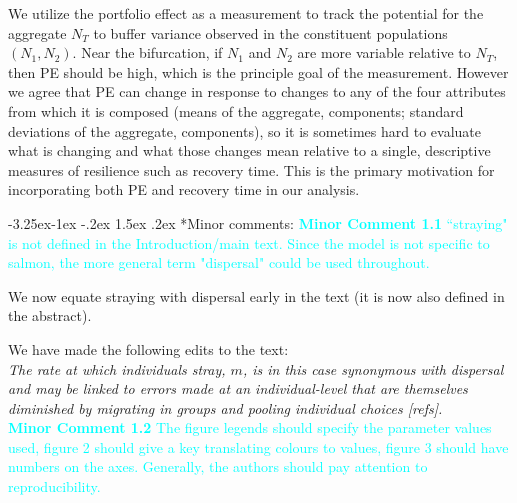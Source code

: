 \documentclass[ucm,12pt]{ucletter}
\makeatletter
\newcounter{section}
\newcounter{subsection}[section]
\newcommand\subsection{\@startsection{subsection}{2}{\z@}%
                                     {-3.25ex\@plus -1ex \@minus -.2ex}%
                                     {1.5ex \@plus .2ex}%
                                     {\normalfont\large\bfseries}}
\makeatother
\begin{document}
\begin{letter}
 We utilize the portfolio effect as a measurement to track the potential for the aggregate $N_T$ to buffer variance observed in the constituent populations $(N_1,N_2)$. Near the bifurcation, if $N_1$ and $N_2$ are more variable relative to $N_T$, then PE should be high, which is the principle goal of the measurement. 
However we agree that PE can change in response to changes to any of the four attributes from which it is composed (means of the aggregate, components; standard deviations of the aggregate, components), so it is sometimes hard to evaluate what is changing and what those changes mean relative to a single, descriptive measures of resilience such as recovery time. This is the primary motivation for incorporating both PE and recovery time in our analysis. 


\subsection*{Minor comments:}
\noindent \textcolor{cyan}{
{\bf Minor Comment 1.1} ``straying" is not defined in the Introduction/main text. Since the model is not specific to salmon, the more general term "dispersal" could be used throughout.}

 We now equate straying with dispersal early in the text (it is now also defined in the abstract).

\noindent We have made the following edits to the text:\\
 \emph{The rate at which individuals stray, $m$, is in this case synonymous with dispersal and may be linked to errors made at an individual-level that are themselves diminished by migrating in groups and pooling individual choices [refs].}\\

\noindent \textcolor{cyan}{
{\bf Minor Comment 1.2} The figure legends should specify the parameter values used, figure 2 should give a key translating colours to values, figure 3 should have numbers on the axes. Generally, the authors should pay attention to reproducibility.}


\end{letter}
\end{document}
